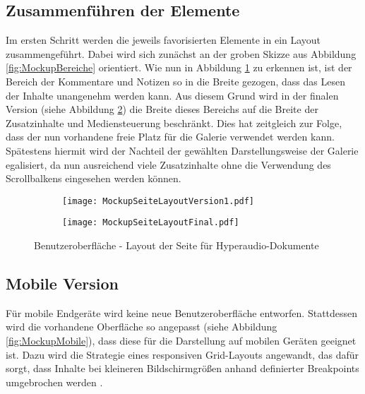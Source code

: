 \subsection{Zusammenführen der Elemente}
Im ersten Schritt werden die jeweils favorisierten Elemente in ein Layout zusammengeführt. Dabei  wird sich zunächst an der groben Skizze aus Abbildung \ref{fig:MockupBereiche} orientiert. Wie nun in Abbildung \ref{fig:MockupSeiteLayoutVersion1} zu erkennen ist, ist der Bereich der Kommentare und Notizen so in die Breite gezogen, dass das Lesen der Inhalte unangenehm werden kann. Aus diesem Grund wird in der finalen Version (siehe Abbildung \ref{fig:MockupSeiteLayoutFinal}) die Breite dieses Bereichs auf die Breite der Zusatzinhalte und Mediensteuerung beschränkt. Dies hat zeitgleich zur Folge, dass der nun vorhandene freie Platz für die Galerie verwendet werden kann. Spätestens hiermit wird der Nachteil der gewählten Darstellungsweise der Galerie egalisiert, da nun ausreichend viele Zusatzinhalte ohne die Verwendung des Scrollbalkens eingesehen werden können.

\begin{figure}[h!]
\begin{subfigure}[c]{\textwidth}
\texttt{[image: MockupSeiteLayoutVersion1.pdf]}
\label{fig:MockupSeiteLayoutVersion1}
\end{subfigure}
\par\bigskip
\begin{subfigure}[c]{\textwidth}
\texttt{[image: MockupSeiteLayoutFinal.pdf]}
\label{fig:MockupSeiteLayoutFinal}
\end{subfigure}
\caption{Benutzeroberfläche - Layout der Seite für Hyperaudio-Dokumente}
\label{fig:MockupSeiteLayout}
\end{figure}

\subsection{Mobile Version}
\label{sub:mobile}
Für mobile Endgeräte wird keine neue Benutzeroberfläche entworfen. Stattdessen wird die vorhandene Oberfläche so angepasst (siehe Abbildung \ref{fig:MockupMobile}), dass diese für die Darstellung auf mobilen Geräten geeignet ist. Dazu wird die Strategie eines responsiven Grid-Layouts angewandt, das dafür sorgt, dass Inhalte bei kleineren Bildschirmgrößen anhand definierter Breakpoints umgebrochen werden \citep{hellichtresponsive}.

